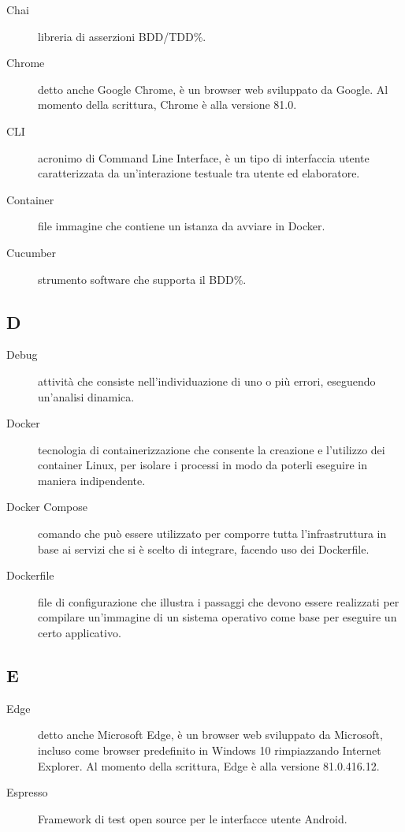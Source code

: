 \documentclass[../../../manuale.sviluppatore.tex]{subfiles}
\begin{document}
\begin{description}
    \item[Chai] libreria di asserzioni BDD/TDD\%.
    \item[Chrome] detto anche Google Chrome, è un browser web sviluppato da Google. Al momento della scrittura, Chrome è alla versione 81.0.
    \item[CLI] acronimo di Command Line Interface, è un tipo di interfaccia utente caratterizzata da un'interazione testuale tra utente ed elaboratore.
    \item[Container] file immagine che contiene un istanza da avviare in Docker.
    \item[Cucumber] strumento software che supporta il BDD\%.
\end{description}

\subsection{D}

\begin{description}
    \item[Debug] attività che consiste nell'individuazione di uno o più errori, eseguendo un'analisi dinamica.
    \item[Docker] tecnologia di containerizzazione che consente la creazione e l'utilizzo dei container Linux, per isolare i processi in modo da poterli eseguire in maniera indipendente.
    \item[Docker Compose] comando che può essere utilizzato per comporre tutta l'infrastruttura in base ai servizi che si è scelto di integrare, facendo uso dei Dockerfile.
    \item[Dockerfile] file di configurazione che illustra i passaggi che devono essere realizzati per compilare un'immagine di un sistema operativo come base per eseguire un certo applicativo.
\end{description}

\subsection{E}

\begin{description}
  \item[Edge] detto anche Microsoft Edge, è un browser web sviluppato da Microsoft, incluso come browser predefinito in Windows 10 rimpiazzando Internet Explorer. Al momento della scrittura, Edge è alla versione 81.0.416.12.
  \item[Espresso] Framework di test open source per le interfacce utente Android.
\end{description}
\end{document}
